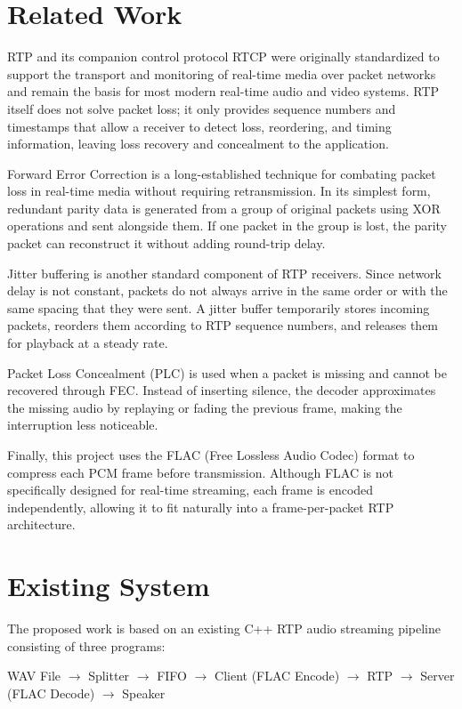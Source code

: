 \documentclass[conference]{IEEEtran}
\begin{document}
\section{Related Work}

RTP and its companion control protocol RTCP were originally standardized to support the transport and monitoring of real-time media over packet networks and remain the basis for most modern real-time audio and video systems. RTP itself does not solve packet loss; it only provides sequence numbers and timestamps that allow a receiver to detect loss, reordering, and timing information, leaving loss recovery and concealment to the application.

Forward Error Correction is a long-established technique for combating packet loss in real-time media without requiring retransmission. In its simplest form, redundant parity data is generated from a group of original packets using XOR operations and sent alongside them. If one packet in the group is lost, the parity packet can reconstruct it without adding round-trip delay.

Jitter buffering is another standard component of RTP receivers. Since network delay is not constant, packets do not always arrive in the same order or with the same spacing that they were sent. A jitter buffer temporarily stores incoming packets, reorders them according to RTP sequence numbers, and releases them for playback at a steady rate.

Packet Loss Concealment (PLC) is used when a packet is missing and cannot be recovered through FEC. Instead of inserting silence, the decoder approximates the missing audio by replaying or fading the previous frame, making the interruption less noticeable.

Finally, this project uses the FLAC (Free Lossless Audio Codec) format to compress each PCM frame before transmission. Although FLAC is not specifically designed for real-time streaming, each frame is encoded independently, allowing it to fit naturally into a frame-per-packet RTP architecture.

\section{Existing System}

The proposed work is based on an existing C++ RTP audio streaming pipeline consisting of three programs:

\begin{center}
WAV File $\rightarrow$ Splitter $\rightarrow$ FIFO $\rightarrow$ Client (FLAC Encode) $\rightarrow$ RTP $\rightarrow$ Server (FLAC Decode) $\rightarrow$ Speaker
\end{center}
\end{document}
